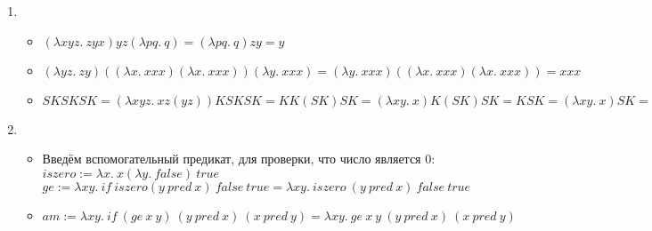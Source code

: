
\begin{enumerate}
  \item
    \begin{itemize}
      \item
        $(\lambda xyz.~zyx)yz(\lambda pq.~q) = (\lambda pq.~q)zy = y$
        
      \item
        $(\lambda yz.~zy)((\lambda x.~xxx)(\lambda x.~xxx))(\lambda y.~xxx) = (\lambda y.~xxx)((\lambda x.~xxx)(\lambda x.~xxx)) = xxx$
      
      \item 
       $SKSKSK = (\lambda xyz.~xz(yz))KSKSK = KK(SK)SK = (\lambda xy.~x)K(SK)SK = KSK = (\lambda xy.~x)SK = S$
      
    \end{itemize}    
    
  \item
    \begin{itemize}
      \item
        Введём вспомогательный предикат, для проверки, что число является 0:\\
        $iszero := \lambda x.~x (\lambda y.~false)~true$\\
        $ge := \lambda xy.~if~iszero (y~pred~x)~false~true = \lambda xy.~iszero~(y~pred~x)~false~true$
        
      \item
        $am := \lambda xy.~ if~(ge~x~y)~(y~pred~x)~(x~pred~y) = \lambda xy.~ ge~x~y~(y~pred~x)~(x~pred~y)$\\
      
    \end{itemize}
\end{enumerate}